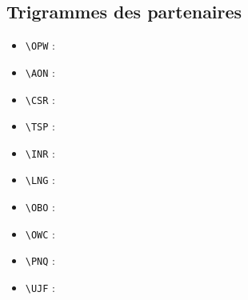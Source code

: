 \documentclass[a4paper,11pt,twoside]{report}
\begin{document}
\subsection{Trigrammes des partenaires}

\begin{itemize}
\item \verb+\OPW+ : \OPW
\item \verb+\AON+ : \AON
\item \verb+\CSR+ : \CSR
\item \verb+\TSP+ : \TSP
\item \verb+\INR+ : \INR
\item \verb+\LNG+ : \LNG
\item \verb+\OBO+ : \OBO
\item \verb+\OWC+ : \OWC
\item \verb+\PNQ+ : \PNQ
\item \verb+\UJF+ : \UJF
\end{itemize}


\end{document}
